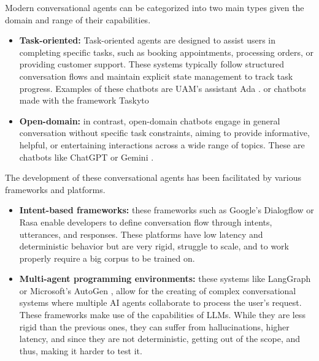 Modern conversational agents can be categorized into two main types
given the domain and range of their capabilities.
\begin{itemize}
  \item \textbf{Task-oriented:}
    Task-oriented agents are designed to assist users in completing specific tasks,
    such as booking appointments, processing orders, or providing customer support.
    These systems typically follow structured conversation flows
    and maintain explicit state management to track task progress.
    Examples of these chatbots are
    UAM's assistant Ada \autocite{AdaUAM}.
    or chatbots made with the framework Taskyto \autocite{sanchezcuadradoAutomatingDevelopmentTaskoriented2024}

  \item \textbf{Open-domain:}
    in contrast, open-domain chatbots
    engage in general conversation without specific task constraints,
    aiming to provide informative, helpful, or entertaining interactions across a wide range of topics.
    These are chatbots like ChatGPT \autocite{ChatGPT} or Gemini \autocite{GoogleGemini}.
\end{itemize}

The development of these conversational agents
has been facilitated by various frameworks and platforms.
\begin{itemize}
  \item \textbf{Intent-based frameworks:}
    these frameworks such as Google's Dialogflow \autocite{Dialogflow} or Rasa \autocite{Rasa2020}
    enable developers to define conversation flow through intents, utterances, and responses.
    These platforms have low latency and deterministic behavior
    but are very rigid, struggle to scale,
    and to work properly require a big corpus to be trained on.

  \item \textbf{Multi-agent programming environments:}
    these systems like LangGraph \autocite{LangGraph} or Microsoft's AutoGen \autocite{AutoGen},
    allow for the creating of complex conversational systems
    where multiple \ac{AI} agents collaborate to process the user's request.
    These frameworks make use of the capabilities of \acp{LLM}.
    While they are less rigid than the previous ones,
    they can suffer from hallucinations,
    higher latency, and since they are not deterministic,
    getting out of the scope, and thus, making it harder to test it.
\end{itemize}

